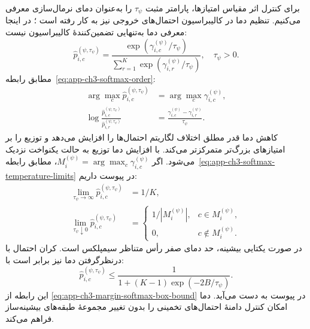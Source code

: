 برای کنترل اثر مقیاس امتیازها، پارامتر مثبت
$\tau_\psi$ را به‌عنوان دمای نرمال‌سازی معرفی می‌کنیم. تنظیم دما در کالیبراسیون احتمال‌های خروجی نیز به کار رفته است \cite{Guo2017Calibration}؛ در اینجا معرفی دما به‌تنهایی تضمین‌کنندهٔ کالیبراسیون نیست:
\begin{equation}\label{cmp:eq:ch3-margin-softmax}
\boxed{\widehat p_{i,c}^{(\psi,\tau_\psi)}
=\frac{\exp(\gamma_{i,c}^{(\psi)}/\tau_\psi)}
{\sum_{r=1}^{K}\exp(\gamma_{i,r}^{(\psi)}/\tau_\psi)},
\quad \tau_\psi>0.}
\end{equation}
مطابق رابطه~\eqref{eq:app-ch3-softmax-order}:
\begin{equation}\label{cmp:eq:ch3-margin-softmax-order}
\begin{aligned}
\arg\max_c\widehat p_{i,c}^{(\psi,\tau_\psi)}
&=\arg\max_c\gamma_{i,c}^{(\psi)},\\
\log\frac{\widehat p_{i,c}^{(\psi,\tau_\psi)}}
{\widehat p_{i,r}^{(\psi,\tau_\psi)}}
&=\frac{\gamma_{i,c}^{(\psi)}-\gamma_{i,r}^{(\psi)}}{\tau_\psi}.
\end{aligned}
\end{equation}
کاهش دما قدر مطلق اختلاف لگاریتم احتمال‌ها را
افزایش می‌دهد و توزیع را بر امتیازهای بزرگ‌تر
متمرکزتر می‌کند. با افزایش دما توزیع به حالت
یکنواخت نزدیک می‌شود. اگر
$M_i^{(\psi)}=\arg\max_c\gamma_{i,c}^{(\psi)}$،
مطابق رابطه~\eqref{eq:app-ch3-softmax-temperature-limits}
در پیوست داریم:
\begin{equation}\label{cmp:eq:ch3-margin-temperature-limits}
\begin{aligned}
\lim_{\tau_\psi\to\infty}\widehat p_{i,c}^{(\psi,\tau_\psi)}
&=1/K,\\
\lim_{\tau_\psi\downarrow0}\widehat p_{i,c}^{(\psi,\tau_\psi)}
&=\begin{cases}
1/|M_i^{(\psi)}|,&c\in M_i^{(\psi)},\\
0,&c\notin M_i^{(\psi)}.
\end{cases}
\end{aligned}
\end{equation}
در صورت یکتایی بیشینه، حد دمای صفر رأس متناظر
سیمپلکس است. کران احتمال با درنظرگرفتن دما نیز برابر است با:
\begin{equation}\label{cmp:eq:ch3-margin-softmax-ceiling}
\boxed{\widehat p_{i,c}^{(\psi,\tau_\psi)}
\le\frac{1}{1+(K-1)\exp(-2B/\tau_\psi)}.}
\end{equation}
این رابطه از
\eqref{eq:app-ch3-margin-softmax-box-bound} در پیوست
به دست می‌آید. دما امکان کنترل دامنهٔ احتمال‌های
تخمینی را بدون تغییر مجموعهٔ طبقه‌های بیشینه‌ساز
فراهم می‌کند.


